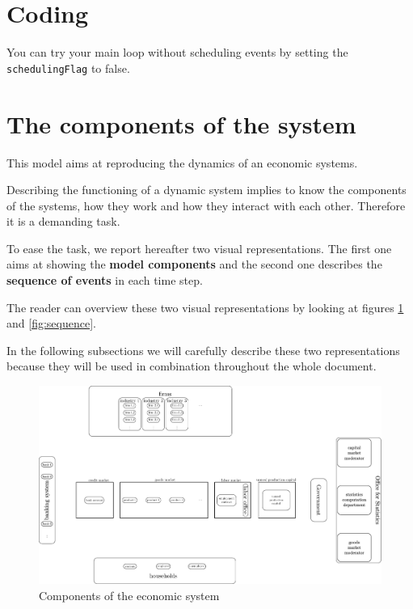 \documentclass{article}
\begin{document}
\tableofcontents
\section{Coding}
You can try your main loop without scheduling events by setting the \verb+schedulingFlag+ to false.
\section{The components of the system}
This model aims at reproducing the dynamics of an economic systems.

Describing the functioning of a dynamic system implies to know the components of the systems, how they work and how they interact with each other. 
Therefore it is a demanding task.

To ease the task, we report hereafter two visual representations. The first one aims at showing the \textbf{model components} and the second one describes the \textbf{sequence of events} in each time step.

The reader can overview these two visual representations by looking at figures \ref{fig:components} and \ref{fig:sequence}.

In the following subsections we will carefully describe these two representations because they will be used in combination throughout the whole document. 

\begin{figure}[htp]
\hskip-1cm\includegraphics[scale=0.5]{agents_and_interactions_figure1.pdf}
	\caption{Components of the economic system}
	\label{fig:components}
\end{figure}
\end{document}
